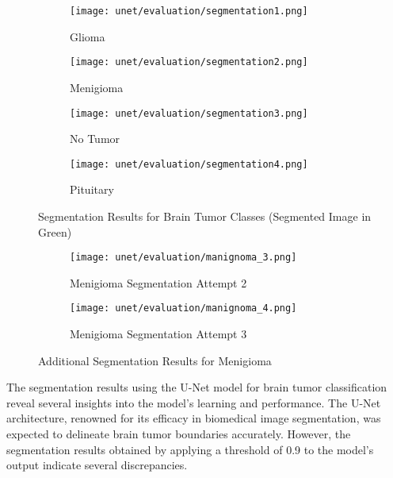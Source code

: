 \begin{figure}[H]
  \centering
  \begin{subfigure}[b]{0.23\textwidth}
    \centering
    \texttt{[image: unet/evaluation/segmentation1.png]}
    \caption{Glioma}
    \label{fig:glio_seg}
  \end{subfigure}
  \hfill
  \begin{subfigure}[b]{0.23\textwidth}
    \centering
    \texttt{[image: unet/evaluation/segmentation2.png]}
    \caption{Menigioma}
    \label{fig:meng_seg}
  \end{subfigure}
  \hfill
  \begin{subfigure}[b]{0.23\textwidth}
    \centering
    \texttt{[image: unet/evaluation/segmentation3.png]}
    \caption{No Tumor}
    \label{fig:no_tumor_seg}
  \end{subfigure}
  \hfill
  \begin{subfigure}[b]{0.23\textwidth}
    \centering
    \texttt{[image: unet/evaluation/segmentation4.png]}
    \caption{Pituitary}
    \label{fig:pitu_seg}
  \end{subfigure}
  \caption{Segmentation Results for Brain Tumor Classes (Segmented Image in Green)}
  \label{fig:segmentation_results}
\end{figure}

\begin{figure}[H]
  \centering
  \begin{subfigure}[b]{0.33\textwidth}
    \centering
    \texttt{[image: unet/evaluation/manignoma\_3.png]}
    \caption{Menigioma Segmentation Attempt 2}
    \label{fig:manignoma_1}
  \end{subfigure}
  \begin{subfigure}[b]{0.33\textwidth}
    \centering
    \texttt{[image: unet/evaluation/manignoma\_4.png]}
    \caption{Menigioma Segmentation Attempt 3}
    \label{fig:mengioma_2}
  \end{subfigure}
  \caption{Additional Segmentation Results for Menigioma}
  \label{fig:manignoma_segmentation}
\end{figure}


The segmentation results using the U-Net model for brain tumor classification reveal several insights into the model's learning and performance. The U-Net architecture, renowned for its efficacy in biomedical image segmentation, was expected to delineate brain tumor boundaries accurately. However, the segmentation results obtained by applying a threshold of 0.9 to the model's output indicate several discrepancies.

